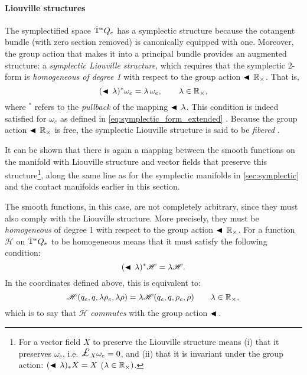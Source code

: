 \paragraph{Liouville structures} The symplectified space \(\mathrm{\dot{T}}^*Q_e\) has a symplectic structure because the cotangent bundle (with zero section removed) is canonically equipped with one. Moreover, the group action that makes it into a principal bundle provides an augmented structure: a \emph{symplectic Liouville structure}, which requires that the symplectic 2-form is \emph{homogeneous of degree 1} with respect to the group action \(\blacktriangleleft\,\mathbb{R}_{\times}\). That is,
\begin{equation}
     (\blacktriangleleft\,\lambda)^* \omega_e = \lambda\,\omega_e, \qquad \lambda \in \mathbb{R}_{\times},
\end{equation}
where $^*$ refers to the \emph{pullback} of the mapping $\blacktriangleleft\,\lambda$. This condition is indeed satisfied for \(\omega_e\) as defined in \cref{eq:symplectic_form_extended} \cite{Libermann1987}. Because the group action \(\blacktriangleleft\,\mathbb{R}_{\times}\) is free, the symplectic Liouville structure is said to be \emph{fibered} \cite{Libermann1987}.

It can be shown that there is again a mapping between the smooth functions on the manifold with Liouville structure and vector fields that preserve this structure\footnote
{For a vector field \(X\) to preserve the Liouville structure means (i) that it preserves \(\omega_e\), i.e. \(\lied{X}{\omega_e} = 0\), and (ii) that it is invariant under the group action: \( (\blacktriangleleft\,\lambda)_* X = X\) (\(\lambda \in \mathbb{R}_{\times})\). }, along the same line as for the symplectic manifolds in \cref{sec:symplectic} and the contact manifolds earlier in this section.

The smooth functions, in this case, are not completely arbitrary, since they must also comply with the Liouville structure. More precisely, they must be \emph{homogeneous} of degree 1 with respect to the group action \(\blacktriangleleft\,\mathbb{R}_{\times}\). For a function \(\mathscr{H}\) on \(\mathrm{\dot{T}}^*Q_e\) to be homogeneous means that it must satisfy the following condition:
\begin{equation}
     (\blacktriangleleft\,\lambda )^* \mathscr{H} = \lambda \mathscr{H}.
\end{equation}
In the coordinates defined above, this is equivalent to:
\begin{equation}
     \mathscr{H}(q_e, q, \lambda \rho_e, \lambda \rho) = \lambda\mathscr{H}(q_e, q, \rho_e, \rho) \qquad \lambda \in \mathbb{R}_{\times},
\end{equation}
which is to say that \(\mathscr{H}\) \emph{commutes} with the group action $\blacktriangleleft\,$.

